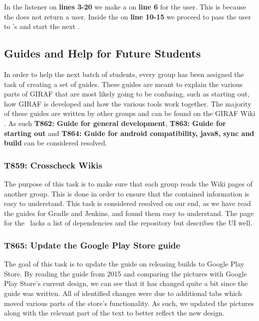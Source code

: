 In the  listener on \textbf{lines 3-20} we make a
 on \textbf{line 6} for the user. This is because the
 does not return a user. Inside the
 on \textbf{line 10-15} we proceed to pass the user to
's  and start the next .\nl



\subsection{Guides and Help for Future Students}
In order to help the next batch of students, every group has been assigned the
task of creating a set of guides. These guides are meant to explain the various
parts of GIRAF that are most likely going to be confusing, such as starting out,
how GIRAF is developed and how the various tools work together. The majority of
these guides are written by other groups and can be found on the GIRAF Wiki
\citep{GWiki}. As such \textbf{T862: Guide for general development},
\textbf{T863: Guide for starting out} and \textbf{T864: Guide for android
compatibility, java8, sync and build} can be considered resolved.

\subsubsection{T859: Crosscheck Wikis}
The purpose of this task is to make sure that each group reads the Wiki pages of
another group. This is done in order to ensure that the contained information is
easy to understand. This task is considered resolved on our end, as we have
read the guides for Gradle and Jenkins, and found them easy to understand.
The page for the \wapp\ lacks a list of dependencies and the repository but
describes the UI well.

\subsubsection{T865: Update the Google Play Store guide}
The goal of this task is to update the guide on releasing builds to Google Play
Store. By reading the guide from 2015 and comparing the pictures with Google
Play Store's current design, we can see that it has changed quite a bit since
the guide was written. All of identified changes were due to additional
tabs which moved various parts of the store's functionality. As such, we updated
the pictures along with the relevant part of the text to better reflect the
new design.

